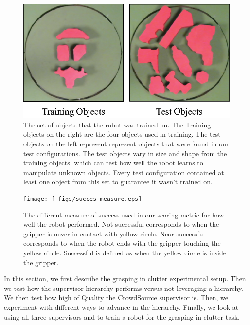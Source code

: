 \documentclass[10pt, conference]{ieeeconf}      %
\begin{document}
\begin{figure}[t]
\centering
\includegraphics{f_figs/shapes_set.eps}

\caption{\footnotesize  The set of objects that the robot was trained on. The Training objects on the right are the four objects used in training. The test objects on the left represent represent objects that were found in our test configurations. The test objects vary in size and shape from the training objects, which can test how well the robot learns to manipulate unknown objects. Every test configuration contained at least one object from this set to guarantee it wasn't trained on.  }

\label{fig:shape_set}
\end{figure}


\begin{figure}[t]
\centering
\texttt{[image: f\_figs/succes\_measure.eps]}

\caption{\footnotesize  The different measure of success used in our scoring metric for how well the robot performed.  Not successful corresponds to when the gripper is never in contact with yellow circle. Near successful corresponds to when the robot ends with the gripper touching the yellow circle. Successful is defined as when the yellow circle is inside the gripper. }
\vspace*{-20pt}
\label{fig:suc_meas}
\end{figure}


In this section, we first describe the grasping in clutter experimental setup. Then we test how the supervisor hierarchy performs versus not leveraging a hierarchy. We then test how high of Quality the CrowdSource supervisor is. Then, we experiment with different ways to advance in the hierarchy. Finally, we look at using all three supervisors and to train a robot for the grasping in clutter task. 
\end{document}
